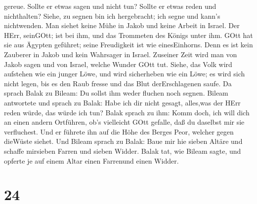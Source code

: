 gereue. Sollte er etwas sagen und nicht tun? Sollte er etwas reden und
nichthalten?  Siehe, zu segnen bin ich hergebracht; ich
segne und kann's nichtwenden.  Man siehet keine Mühe in
Jakob und keine Arbeit in Israel. Der HErr, seinGOtt; ist bei ihm, und
das Trommeten des Königs unter ihm.  GOtt hat sie aus
Ägypten geführet; seine Freudigkeit ist wie einesEinhorns. 
Denn es ist kein Zauberer in Jakob und kein Wahrsager in Israel.
Zuseiner Zeit wird man von Jakob sagen und von Israel, welche Wunder
GOtt tut.  Siehe, das Volk wird aufstehen wie ein junger
Löwe, und wird sicherheben wie ein Löwe; es wird sich nicht legen, bis
es den Raub fresse und das Blut derErschlagenen saufe.  Da
sprach Balak zu Bileam: Du sollst ihm weder fluchen noch segnen.
 Bileam antwortete und sprach zu Balak: Habe ich dir nicht
gesagt, alles,was der HErr reden würde, das würde ich tun? 
Balak sprach zu ihm: Komm doch, ich will dich an einen andern Ortführen,
ob's vielleicht GOtt gefalle, daß du daselbst mir sie verfluchest.
 Und er führete ihn auf die Höhe des Berges Peor, welcher
gegen dieWüste siehet.  Und Bileam sprach zu Balak: Baue
mir hie sieben Altäre und schaffe mirsieben Farren und sieben Widder.
 Balak tat, wie Bileam sagte, und opferte je auf einem
Altar einen Farrenund einen Widder.

\hypertarget{section-23}{%
\section{24}\label{section-23}}

